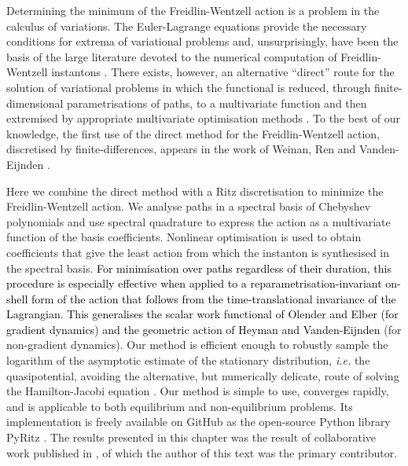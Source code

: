 Determining the minimum of the Freidlin-Wentzell action is a problem
in the calculus of variations. The Euler-Lagrange equations provide
the necessary conditions for extrema of variational problems and,
unsurprisingly, have been the basis of the large literature devoted
to the numerical computation of Freidlin-Wentzell instantons \citep{weinanStringMethodStudy2002, paninskiMostLikelyVoltage2006a, vanden-eijndenGeometricMinimumAction2008b, grafkeLongTermEffects2017}.
There exists, however, an alternative ``direct'' route for the solution
of variational problems in which the functional is reduced, through
finite-dimensional parametrisations of paths, to a multivariate function
and then extremised by appropriate multivariate
optimisation methods \citep{gelfandCalculusVariations2012a, kantorovich1958approximate}.
To the best of our knowledge, the first use of the direct method for
the Freidlin-Wentzell action, discretised by finite-differences, appears
in the work of Weinan, Ren and Vanden-Eijnden \citep{eMinimumActionMethod2004a}. 

Here we combine the direct method with a Ritz discretisation \citep{ritz1909uber, gelfandCalculusVariations2012a, kantorovich1958approximate}
to minimize the Freidlin-Wentzell action. We analyse paths in a spectral
basis of Chebyshev polynomials and use spectral quadrature to express
the action as a multivariate function of the basis coefficients. Nonlinear
optimisation is used to obtain coefficients that give the least action
from which the instanton is synthesised in the spectral basis.\textcolor{black}{{}
For minimisation over paths regardless of their duration, this procedure
is especially effective when applied to a reparametrisation-invariant
on-shell form of the action that follows from the time-translational
invariance of the Lagrangian. This generalises the scalar work functional
of Olender and Elber (for gradient dynamics) and the geometric action
of Heyman and Vanden-Eijnden} \citep{vanden-eijndenGeometricMinimumAction2008b} (for non-gradient
dynamics). Our method is efficient enough to robustly sample the logarithm
of the asymptotic estimate of the stationary distribution, \emph{i.e.
}the quasipotential, avoiding the alternative, but numerically delicate,
route of solving the Hamilton-Jacobi equation \citep{cameron2012finding, yang2019computing, dahiyaOrderedLineIntegral2018a}.
Our method is simple to use, converges rapidly, and is applicable
to both equilibrium and non-equilibrium problems. Its implementation
is freely available on GitHub as the open-source Python library PyRitz \citep{lukaskikuchiPyRitz2022}. The results presented in this chapter was the result of collaborative work published in \citep{kikuchiRitzMethodTransition2020a}, of which the author of this text was the primary contributor.

